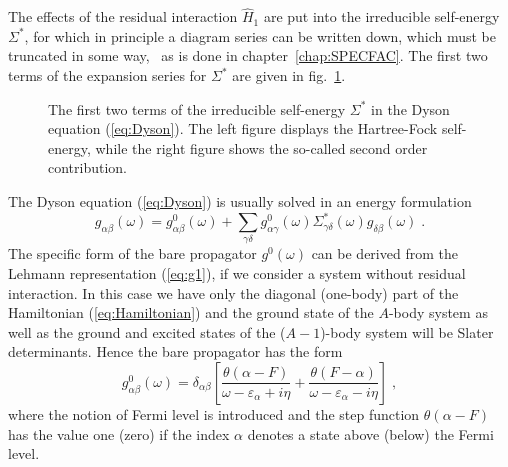 The effects of the residual interaction $\hat{H}_1$ 
are put 
into the irreducible self-energy $\Sigma^\ast$, for which in principle
a diagram series can be written down, which must be truncated in some way, 
\eg\ as is done in chapter~\ref{chap:SPECFAC}. 
The first two terms of the expansion series for 
$\Sigma^\ast$ are given in fig.~\ref{fig:Self}.
\begin{figure}
\centerline{
}
\caption[]{The first two terms of the irreducible self-energy 
$\Sigma^\ast$ in the Dyson equation (\ref{eq:Dyson}). The left figure
displays the Hartree-Fock self-energy, while the right figure shows the
so-called second order contribution.
\label{fig:Self}
}
\end{figure}

%
%
The Dyson equation (\ref{eq:Dyson}) is usually solved in an energy 
formulation
%
	\begin{equation}
		g_{\alpha\beta}(\omega)
	=
		g^0_{\alpha\beta}(\omega)
	+
		\sum_{\gamma\delta}
		g^0_{\alpha\gamma}(\omega)
		\Sigma^\ast_{\gamma\delta}(\omega)
		g^{\phantom{0}}_{\delta\beta}(\omega)
	\;.
	\label{eq:DysonE}
	\end{equation}
%
The specific form of the bare propagator $g^0(\omega)$ can be derived from
the Lehmann representation (\ref{eq:g1}), if we consider a system without
residual interaction. In this case we have only the diagonal (one-body) part 
of the
Hamiltonian (\ref{eq:Hamiltonian}) and the ground state of the $A$-body
system as well as the ground and excited states of the ($A-1$)-body system 
will be 
Slater determinants. Hence the bare propagator has the form
%
	\begin{equation}
		g^0_{\alpha\beta}(\omega)
	=
		\delta_{\alpha\beta}
		\left[
		\frac{
		\theta( \alpha - F )
		}{ \omega - \varepsilon_\alpha + i \eta }
	+
		\frac{
		\theta( F - \alpha )
		}{ \omega - \varepsilon_\alpha - i \eta }
		\right]
	\label{eq:g10} 
	\;,
	\end{equation}
%
where the notion of Fermi level is introduced and the step function
$\theta(\alpha-F)$ has the value one (zero) if the index $\alpha$ 
denotes a state above (below) the Fermi level. 

